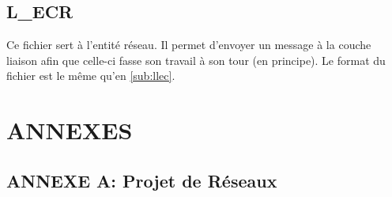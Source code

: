 \documentclass[11pt,french]{article}
\begin{document}
        \subsection{L\_ECR} %
        \label{sub:lecr}
            Ce fichier sert à l'entité réseau. Il permet d'envoyer un message à la couche liaison afin que celle-ci fasse son travail à son tour (en
            principe). Le format du fichier est le même qu'en {\color{blue} \ref{sub:llec}}.
    \newpage
    \section{ANNEXES} %
    \label{sec:ANNEXES}
        \subsection*{ANNEXE A: Projet de Réseaux} %
        \label{sub:ANNEXE A: Projet de Réseaux}
        
        
\end{document}
